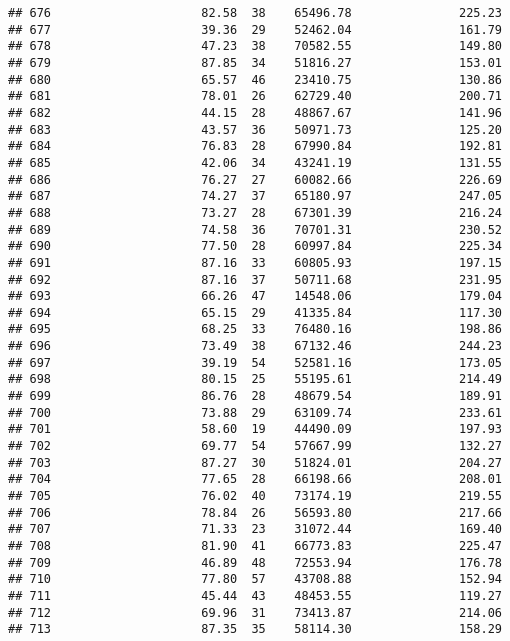 \documentclass[
]{article}
\begin{document}
\begin{verbatim}
## 676                     82.58  38    65496.78               225.23
## 677                     39.36  29    52462.04               161.79
## 678                     47.23  38    70582.55               149.80
## 679                     87.85  34    51816.27               153.01
## 680                     65.57  46    23410.75               130.86
## 681                     78.01  26    62729.40               200.71
## 682                     44.15  28    48867.67               141.96
## 683                     43.57  36    50971.73               125.20
## 684                     76.83  28    67990.84               192.81
## 685                     42.06  34    43241.19               131.55
## 686                     76.27  27    60082.66               226.69
## 687                     74.27  37    65180.97               247.05
## 688                     73.27  28    67301.39               216.24
## 689                     74.58  36    70701.31               230.52
## 690                     77.50  28    60997.84               225.34
## 691                     87.16  33    60805.93               197.15
## 692                     87.16  37    50711.68               231.95
## 693                     66.26  47    14548.06               179.04
## 694                     65.15  29    41335.84               117.30
## 695                     68.25  33    76480.16               198.86
## 696                     73.49  38    67132.46               244.23
## 697                     39.19  54    52581.16               173.05
## 698                     80.15  25    55195.61               214.49
## 699                     86.76  28    48679.54               189.91
## 700                     73.88  29    63109.74               233.61
## 701                     58.60  19    44490.09               197.93
## 702                     69.77  54    57667.99               132.27
## 703                     87.27  30    51824.01               204.27
## 704                     77.65  28    66198.66               208.01
## 705                     76.02  40    73174.19               219.55
## 706                     78.84  26    56593.80               217.66
## 707                     71.33  23    31072.44               169.40
## 708                     81.90  41    66773.83               225.47
## 709                     46.89  48    72553.94               176.78
## 710                     77.80  57    43708.88               152.94
## 711                     45.44  43    48453.55               119.27
## 712                     69.96  31    73413.87               214.06
## 713                     87.35  35    58114.30               158.29

\end{verbatim}
\end{document}
